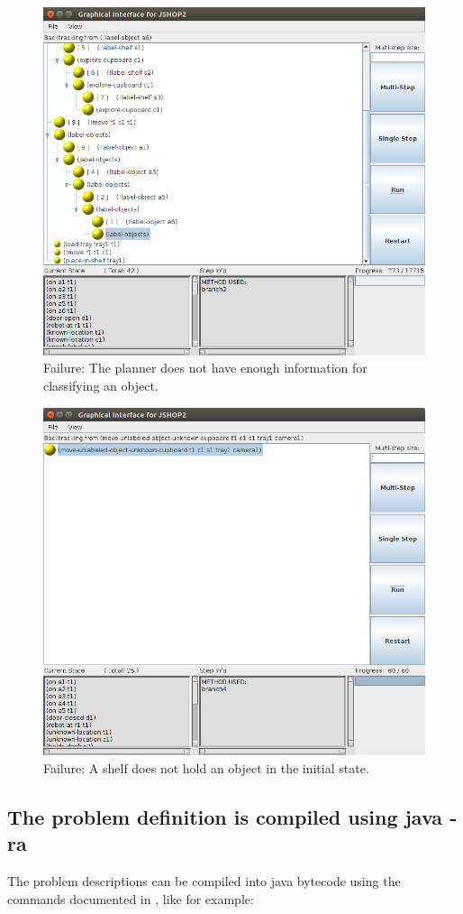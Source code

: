 \documentclass[paper=a4, fontsize=11pt]{scrartcl}
\begin{document}
\begin{figure} [ht!]
	\centering
	\includegraphics[width=0.65\linewidth]{images/failure-1}
	\caption{Failure: The planner does not have enough information for classifying an object.}
	\label{fig:failure-1}
\end{figure}


\begin{figure} [h!]
	\centering
	\includegraphics[width=0.65\linewidth]{images/failure-2}
	\caption{Failure: A shelf does not hold an object in the initial state.}
	\label{fig:failure-2}
\end{figure}


\subsection{The problem definition is compiled using java -ra}

The problem descriptions can be compiled into java bytecode using the commands documented in \cite{Ilghami2006}, like for example:
\end{document}
